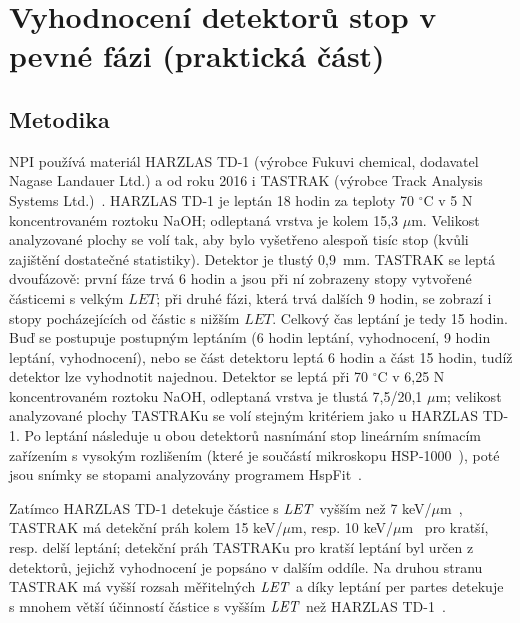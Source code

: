 \chapter{Vyhodnocení detektorů stop v pevné fázi (praktická část)}
\section{Metodika}\label{sec:praktickaCast_metodika}
NPI používá materiál HARZLAS TD-1 (výrobce Fukuvi chemical, dodavatel Nagase Landauer Ltd.) a od roku 2016 i TASTRAK (výrobce Track Analysis Systems Ltd.)~\cite{cesky}. HARZLAS TD-1 je leptán 18 hodin za teploty 70 $^{\circ}$C v 5 N koncentrovaném roztoku NaOH; odleptaná vrstva je kolem 15,3 $\mu$m. Velikost analyzované plochy se volí tak, aby bylo vyšetřeno alespoň tisíc stop (kvůli zajištění dostatečné statistiky). Detektor je tlustý 0,9~mm. TASTRAK se leptá dvoufázově: první fáze trvá 6 hodin a jsou při ní zobrazeny stopy vytvořené částicemi s velkým $\mathit{LET}$; při druhé fázi, která trvá dalších 9 hodin, se zobrazí i stopy pocházejících od částic s nižším $\mathit{LET}$. Celkový čas leptání je tedy 15 hodin. Buď se postupuje postupným leptáním (6 hodin leptání, vyhodnocení, 9 hodin leptání, vyhodnocení), nebo se část detektoru leptá 6 hodin a část 15 hodin, tudíž
detektor lze vyhodnotit najednou. Detektor se leptá při 70 $^{\circ}$C v 6,25 N koncentrovaném roztoku NaOH, odleptaná vrstva je tlustá 7,5/20,1 $\mu$m; velikost analyzované plochy TASTRAKu se volí stejným kritériem jako u HARZLAS TD-1. Po leptání následuje u obou detektorů nasnímání stop lineárním snímacím zařízením s vysokým rozlišením (které je součástí mikroskopu HSP-1000~\cite{dosis_HSP1000}), poté jsou snímky se stopami analyzovány programem HspFit~\cite{hspClanek}.

Zatímco HARZLAS TD-1 detekuje částice s $\mathit{LET}$ vyšším než 7 keV/$\mu$m~\cite{cesky}, TASTRAK má detekční práh kolem 15 keV/$\mu$m, resp. 10 keV/$\mu$m~\cite{ssntd} pro kratší, resp. delší leptání; detekční práh TASTRAKu pro kratší leptání byl určen z detektorů, jejichž vyhodnocení je popsáno v dalším oddíle. Na druhou stranu TASTRAK má vyšší rozsah měřitelných $\mathit{LET}$ a díky leptání per partes detekuje s mnohem větší účinností částice s vyšším $\mathit{LET}$ než HARZLAS TD-1~\cite{cesky}.
\newpage
